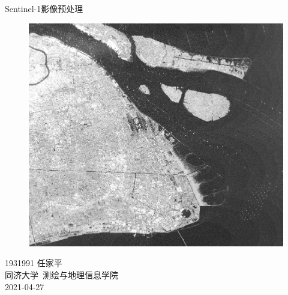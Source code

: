 \documentclass[a4paper, 12pt]{article}
\begin{document}

\begin{center}
    {\Huge 
        Sentinel-1影像预处理}
    \begin{figure}[htbp]
        \centering
        \includegraphics[scale=0.6]{pic/cover.jpg}
    \end{figure}    
    {\Large 
        1931991 任家平\\[12pt]
        同济大学~测绘与地理信息学院\\[12pt]
        2021-04-27}
\end{center}




\thispagestyle{empty}



\newpage
{}
\tableofcontents
\newpage
{}




\listoffigures
{}
\listoftables
{}
\newpage
\nocite{*}


\end{document}
